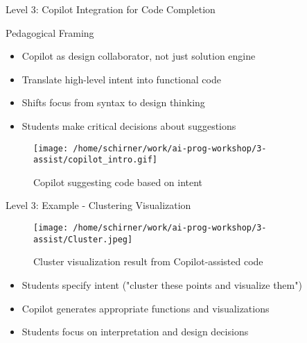 \documentclass{beamer}
\begin{document}
\begin{frame}{Level 3: Copilot Integration for Code Completion}
    \begin{block}{Pedagogical Framing}
        \begin{itemize}
            \item Copilot as design collaborator, not just solution engine
            \item Translate high-level intent into functional code
            \item Shifts focus from syntax to design thinking
            \item Students make critical decisions about suggestions
        \end{itemize}
    \end{block}
    
    \begin{figure}
        \centering
        \texttt{[image: /home/schirner/work/ai-prog-workshop/3-assist/copilot\_intro.gif]}
        \caption{Copilot suggesting code based on intent}
    \end{figure}
\end{frame}

\begin{frame}{Level 3: Example - Clustering Visualization}
    \begin{figure}
        \centering
        \texttt{[image: /home/schirner/work/ai-prog-workshop/3-assist/Cluster.jpeg]}
        \caption{Cluster visualization result from Copilot-assisted code}
    \end{figure}
    
    \begin{itemize}
        \item Students specify intent ("cluster these points and visualize them")
        \item Copilot generates appropriate functions and visualizations
        \item Students focus on interpretation and design decisions
    \end{itemize}
\end{frame}
\end{document}
